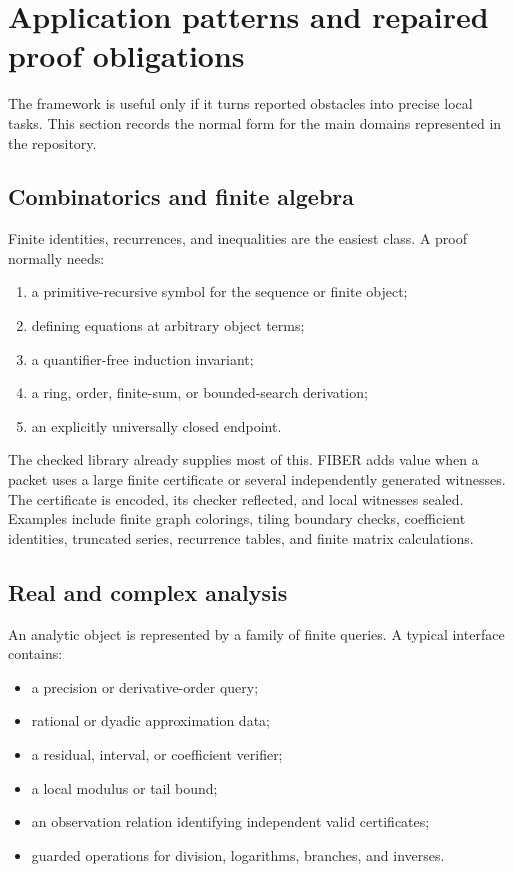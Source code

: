 \section{Application patterns and repaired proof obligations}
\label{sec:domains}

The framework is useful only if it turns reported obstacles into precise local
tasks.  This section records the normal form for the main domains represented
in the repository.

\subsection{Combinatorics and finite algebra}

Finite identities, recurrences, and inequalities are the easiest class.  A
proof normally needs:

\begin{enumerate}
\item a primitive-recursive symbol for the sequence or finite object;
\item defining equations at arbitrary object terms;
\item a quantifier-free induction invariant;
\item a ring, order, finite-sum, or bounded-search derivation;
\item an explicitly universally closed endpoint.
\end{enumerate}

The checked library already supplies most of this.  FIBER adds value when a
packet uses a large finite certificate or several independently generated
witnesses.  The certificate is encoded, its checker reflected, and local
witnesses sealed.  Examples include finite graph colorings, tiling boundary
checks, coefficient identities, truncated series, recurrence tables, and
finite matrix calculations.

\subsection{Real and complex analysis}

An analytic object is represented by a family of finite queries.  A typical
interface contains:

\begin{itemize}
\item a precision or derivative-order query;
\item rational or dyadic approximation data;
\item a residual, interval, or coefficient verifier;
\item a local modulus or tail bound;
\item an observation relation identifying independent valid certificates;
\item guarded operations for division, logarithms, branches, and inverses.
\end{itemize}

